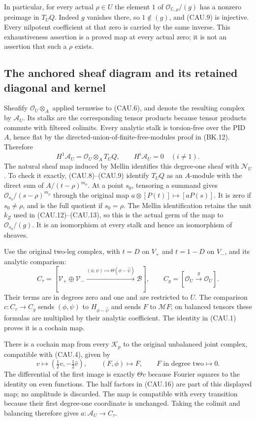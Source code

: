In particular, for every actual $\rho\in U$ the element $1$ of
$\mathcal O_{\mathbb C,\rho}/(g)$ has a nonzero preimage in $T_UQ$.
Indeed $g$ vanishes there, so $1\notin(g)$, and (CAU.9) is injective.
Every nilpotent coefficient at that zero is carried by the same inverse.
This exhaustiveness assertion is a proved map at every actual zero;
it is not an assertion that such a $\rho$ exists.

\subsection{The anchored sheaf diagram and its retained diagonal and kernel}

Sheafify $\mathcal O_U\otimes_A$ applied termwise to (CAU.6), and denote
the resulting complex by $\mathcal A_U$.  Its stalks are the corresponding
tensor products because tensor products commute with filtered colimits.
Every analytic stalk is torsion-free over the PID $A$, hence flat by
the directed-union-of-finite-free-modules proof in (BK.12).  Therefore
\[
 H^1\mathcal A_U=\mathcal O_U\otimes_A T_UQ,
 \qquad H^i\mathcal A_U=0\quad(i\ne1).                       \tag{CAU.14}
\]
The natural sheaf map induced by Mellin identifies this degree-one
sheaf with $\mathcal N_U$.  To check it exactly, (CAU.8)--(CAU.9)
identify $T_UQ$ as an $A$-module with the direct sum of
$A/(t-\rho)^{m_\rho}$.  At a point $s_0$, tensoring a summand gives
$\mathcal O_{s_0}/(s-\rho)^{m_\rho}$ through the original map
$a\otimes[P(t)]\mapsto[aP(s)]$.  It is zero if $s_0\ne\rho$,
and is the full quotient if $s_0=\rho$.  The Mellin identification
retains the unit $k_Z$ used in (CAU.12)--(CAU.13), so this is the
actual germ of the map to $\mathcal O_{s_0}/(g)$.  It is an isomorphism
at every stalk and hence an isomorphism of sheaves.

Use the original two-leg complex, with $t=D$ on $V_+$ and $t=1-D$
on $V_-$, and its analytic comparison:
\[
 C_\tau=[\mathcal V_+\oplus\mathcal V_-
       \xrightarrow{(\phi,\psi)\mapsto\Theta(\phi-\widehat\psi)}
               \mathcal B],\qquad
 C_g=[\mathcal O_U\xrightarrow{g}\mathcal O_U].                \tag{CAU.15}
\]
Their terms are in degrees zero and one and are restricted to $U$.
The comparison $c:C_\tau\to C_g$ sends $(\phi,\psi)$ to
$H_{\phi-\widehat\psi}$ and sends $F$ to $\mathcal MF$;
on balanced tensors these formulas are multiplied by their analytic
coefficient.  The identity in (CAU.1) proves it is a cochain map.

There is a cochain map from every $\mathscr K_p$ to the original
unbalanced joint complex, compatible with (CAU.4), given by
\[
 v\longmapsto\left(\tfrac12v,-\tfrac12\widehat v\right),
 \qquad(F,\phi)\longmapsto F,
 \qquad F\text{ in degree two}\longmapsto0.                  \tag{CAU.16}
\]
The differential of the first image is exactly $\Theta v$ because
Fourier squares to the identity on even functions.  The half factors
in (CAU.16) are part of this displayed map; no amplitude is discarded.
The map is compatible with every transition because their first
degree-one coordinate is unchanged.  Taking the colimit and balancing
therefore gives $a:\mathcal A_U\to C_\tau$.

